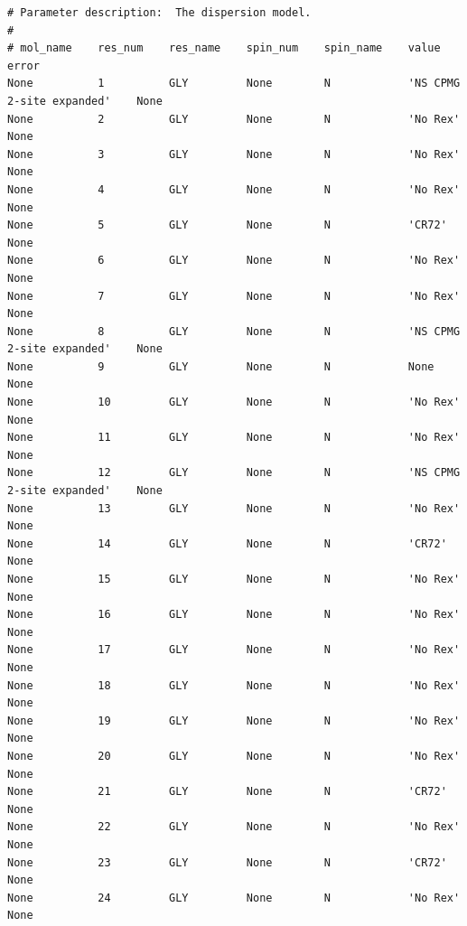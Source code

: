 \begin{lstlisting}[basicstyle=\ttfamily \scriptsize,numbers=none]
# Parameter description:  The dispersion model.
#
# mol_name    res_num    res_name    spin_num    spin_name    value                        error    
None          1          GLY         None        N            'NS CPMG 2-site expanded'    None     
None          2          GLY         None        N            'No Rex'                     None     
None          3          GLY         None        N            'No Rex'                     None     
None          4          GLY         None        N            'No Rex'                     None     
None          5          GLY         None        N            'CR72'                       None     
None          6          GLY         None        N            'No Rex'                     None     
None          7          GLY         None        N            'No Rex'                     None     
None          8          GLY         None        N            'NS CPMG 2-site expanded'    None     
None          9          GLY         None        N            None                         None     
None          10         GLY         None        N            'No Rex'                     None     
None          11         GLY         None        N            'No Rex'                     None     
None          12         GLY         None        N            'NS CPMG 2-site expanded'    None     
None          13         GLY         None        N            'No Rex'                     None     
None          14         GLY         None        N            'CR72'                       None     
None          15         GLY         None        N            'No Rex'                     None     
None          16         GLY         None        N            'No Rex'                     None     
None          17         GLY         None        N            'No Rex'                     None     
None          18         GLY         None        N            'No Rex'                     None     
None          19         GLY         None        N            'No Rex'                     None     
None          20         GLY         None        N            'No Rex'                     None     
None          21         GLY         None        N            'CR72'                       None     
None          22         GLY         None        N            'No Rex'                     None     
None          23         GLY         None        N            'CR72'                       None     
None          24         GLY         None        N            'No Rex'                     None     

\end{lstlisting}

